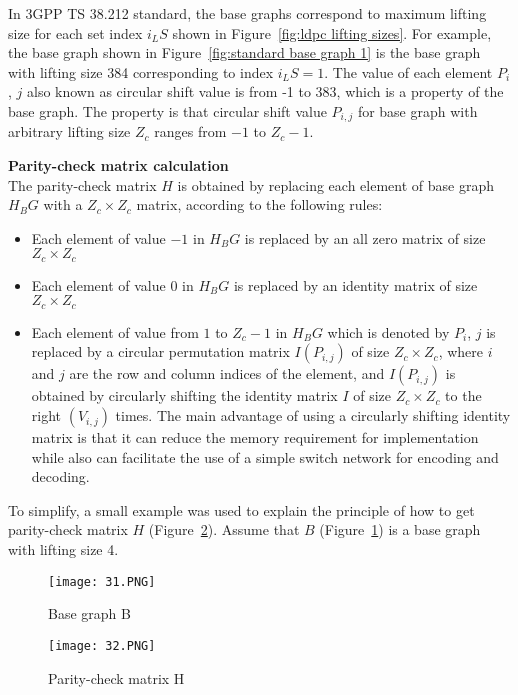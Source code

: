 In 3GPP TS 38.212 standard, the base graphs correspond to maximum lifting size for each set index $i_LS$ shown in Figure~\ref{fig:ldpc lifting sizes}. For example, the base graph shown in Figure~\ref{fig:standard base graph 1} is the base graph with lifting size 384 corresponding to index $i_LS = 1$. The value of each element $P_i$, $j$ also known as circular shift value is from -1 to 383, which is a property of the base graph. The property is that circular shift value $P_{i,j}$ for base graph with arbitrary lifting size $Z_c$ ranges from $-1$ to $Z_c - 1$.

\textbf{Parity-check matrix calculation} \\
The parity-check matrix $H$ is obtained by replacing each element of base graph $H_BG$ with a $Z_c \times Z_c$ matrix, according to the following rules:
\begin{itemize}
    \item Each element of value $-1$ in $H_BG$ is replaced by an all zero matrix of size $Z_c \times Z_c$
    \item Each element of value $0$ in $H_BG$ is replaced by an identity matrix of size $Z_c \times Z_c$
    \item Each element of value from $1$ to $Z_c - 1$ in $H_BG$ which is denoted by $P_i$, $j$ is replaced by a circular permutation matrix $I$$(P_{i,j})$ of size $Z_c \times Z_c$, where $i$ and $j$ are the row and column indices of the element, and $I$$(P_{i,j})$ is obtained by circularly shifting the identity matrix $I$ of size $Z_c \times Z_c$ to the right $(V_{i,j})$ times. The main advantage of using a circularly shifting identity matrix is that it can reduce the memory requirement for implementation while also can facilitate the use of a simple switch network for encoding and decoding.
\end{itemize}

To simplify, a small example was used to explain the principle of how to get parity-check matrix $H$ (Figure~\ref{fig:H parity}). Assume that $B$ (Figure~\ref{fig:B}) is a base graph with lifting size 4.

\begin{figure}[h]
\centering
\texttt{[image: 31.PNG]}
\caption{Base graph B}
\label{fig:B}
\end{figure}

\begin{figure}[h]
\centering
\texttt{[image: 32.PNG]}
\caption{Parity-check matrix H}
\label{fig:H parity}
\end{figure}

